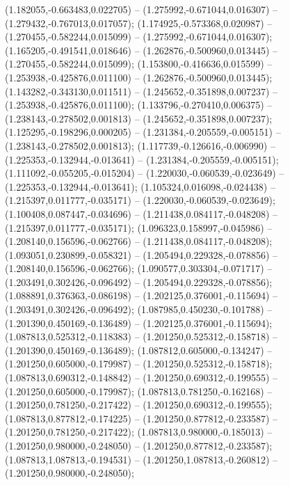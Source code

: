  (1.182055,-0.663483,0.022705) -- (1.275992,-0.671044,0.016307) -- (1.279432,-0.767013,0.017057);
 (1.174925,-0.573368,0.020987) -- (1.270455,-0.582244,0.015099) -- (1.275992,-0.671044,0.016307);
 (1.165205,-0.491541,0.018646) -- (1.262876,-0.500960,0.013445) -- (1.270455,-0.582244,0.015099);
 (1.153800,-0.416636,0.015599) -- (1.253938,-0.425876,0.011100) -- (1.262876,-0.500960,0.013445);
 (1.143282,-0.343130,0.011511) -- (1.245652,-0.351898,0.007237) -- (1.253938,-0.425876,0.011100);
 (1.133796,-0.270410,0.006375) -- (1.238143,-0.278502,0.001813) -- (1.245652,-0.351898,0.007237);
 (1.125295,-0.198296,0.000205) -- (1.231384,-0.205559,-0.005151) -- (1.238143,-0.278502,0.001813);
 (1.117739,-0.126616,-0.006990) -- (1.225353,-0.132944,-0.013641) -- (1.231384,-0.205559,-0.005151);
 (1.111092,-0.055205,-0.015204) -- (1.220030,-0.060539,-0.023649) -- (1.225353,-0.132944,-0.013641);
 (1.105324,0.016098,-0.024438) -- (1.215397,0.011777,-0.035171) -- (1.220030,-0.060539,-0.023649);
 (1.100408,0.087447,-0.034696) -- (1.211438,0.084117,-0.048208) -- (1.215397,0.011777,-0.035171);
 (1.096323,0.158997,-0.045986) -- (1.208140,0.156596,-0.062766) -- (1.211438,0.084117,-0.048208);
 (1.093051,0.230899,-0.058321) -- (1.205494,0.229328,-0.078856) -- (1.208140,0.156596,-0.062766);
 (1.090577,0.303304,-0.071717) -- (1.203491,0.302426,-0.096492) -- (1.205494,0.229328,-0.078856);
 (1.088891,0.376363,-0.086198) -- (1.202125,0.376001,-0.115694) -- (1.203491,0.302426,-0.096492);
 (1.087985,0.450230,-0.101788) -- (1.201390,0.450169,-0.136489) -- (1.202125,0.376001,-0.115694);
 (1.087813,0.525312,-0.118383) -- (1.201250,0.525312,-0.158718) -- (1.201390,0.450169,-0.136489);
 (1.087812,0.605000,-0.134247) -- (1.201250,0.605000,-0.179987) -- (1.201250,0.525312,-0.158718);
 (1.087813,0.690312,-0.148842) -- (1.201250,0.690312,-0.199555) -- (1.201250,0.605000,-0.179987);
 (1.087813,0.781250,-0.162168) -- (1.201250,0.781250,-0.217422) -- (1.201250,0.690312,-0.199555);
 (1.087813,0.877812,-0.174225) -- (1.201250,0.877812,-0.233587) -- (1.201250,0.781250,-0.217422);
 (1.087813,0.980000,-0.185013) -- (1.201250,0.980000,-0.248050) -- (1.201250,0.877812,-0.233587);
 (1.087813,1.087813,-0.194531) -- (1.201250,1.087813,-0.260812) -- (1.201250,0.980000,-0.248050);
